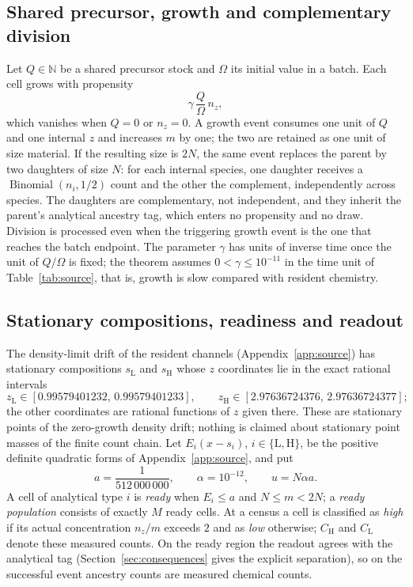 \documentclass[11pt,a4paper]{article}
\theoremstyle{plain}
\theoremstyle{definition}
\theoremstyle{remark}
\newcommand{\N}{\mathbb N}
\newcommand{\lo}{\mathrm L}
\newcommand{\hi}{\mathrm H}
\begin{document}
\subsection{Shared precursor, growth and complementary division}\label{sec:growth}
Let $Q\in\N$ be a shared precursor stock and $\Omega$ its initial value in a batch. Each cell grows with propensity
\begin{equation}\label{eq:growth}
\gamma\,\frac{Q}{\Omega}\,n_z ,
\end{equation}
which vanishes when $Q=0$ or $n_z=0$. A growth event consumes one unit of $Q$ and one internal $z$ and increases $m$ by one; the two are retained as one unit of size material. If the resulting size is $2N$, the same event replaces the parent by two daughters of size $N$: for each internal species, one daughter receives a $\operatorname{Binomial}(n_i,1/2)$ count and the other the complement, independently across species. The daughters are complementary, not independent, and they inherit the parent's analytical ancestry tag, which enters no propensity and no draw. Division is processed even when the triggering growth event is the one that reaches the batch endpoint. The parameter $\gamma$ has units of inverse time once the unit of $Q/\Omega$ is fixed; the theorem assumes $0<\gamma\le10^{-11}$ in the time unit of Table~\ref{tab:source}, that is, growth is slow compared with resident chemistry.

\subsection{Stationary compositions, readiness and readout}\label{sec:ready}
The density-limit drift of the resident channels (Appendix~\ref{app:source}) has stationary compositions $s_\lo$ and $s_\hi$ whose $z$ coordinates lie in the exact rational intervals
\begin{equation}\label{eq:roots}
z_\lo\in[0.99579401232,\,0.99579401233],\qquad z_\hi\in[2.97636724376,\,2.97636724377];
\end{equation}
the other coordinates are rational functions of $z$ given there. These are stationary points of the zero-growth density drift; nothing is claimed about stationary point masses of the finite count chain. Let $E_i(x-s_i)$, $i\in\{\lo,\hi\}$, be the positive definite quadratic forms of Appendix~\ref{app:source}, and put
\begin{equation}\label{eq:constants}
a=\frac1{512\,000\,000},\qquad \alpha=10^{-12},\qquad u=N\alpha a .
\end{equation}
A cell of analytical type $i$ is \emph{ready} when $E_i\le a$ and $N\le m<2N$; a \emph{ready population} consists of exactly $M$ ready cells. At a census a cell is classified as \emph{high} if its actual concentration $n_z/m$ exceeds $2$ and as \emph{low} otherwise; $C_\hi$ and $C_\lo$ denote these measured counts. On the ready region the readout agrees with the analytical tag (Section~\ref{sec:consequences} gives the explicit separation), so on the successful event ancestry counts are measured chemical counts.
\end{document}
